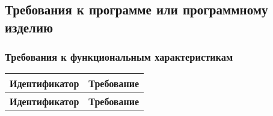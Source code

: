 \documentclass[a4paper, 14pt]{article}
\begin{document}
\subsection{Требования к программе или программному изделию}

\subsubsection{Требования к функциональным характеристикам}

\begin{longtable}{| p{} | p{} |}
    \hline
    \textbf{Идентификатор}          & \textbf{Требование}                                                                                                                                                                \\
    \hline
    \endfirsthead
    \hline
    \textbf{Идентификатор}          & \textbf{Требование}                                                                                                                                                                \\
    \hline
    \endhead


\end{longtable}
\end{document}
